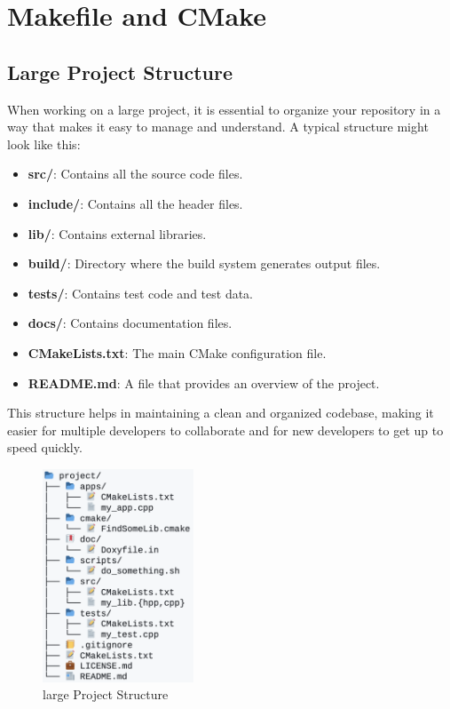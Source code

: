 
\chapter{Makefile and CMake}

\section{Large Project Structure}

When working on a large project, it is essential to organize your repository in a way that makes it easy to manage and understand. A typical structure might look like this:

\begin{itemize}
    \item \textbf{src/}: Contains all the source code files.
    \item \textbf{include/}: Contains all the header files.
    \item \textbf{lib/}: Contains external libraries.
    \item \textbf{build/}: Directory where the build system generates output files.
    \item \textbf{tests/}: Contains test code and test data.
    \item \textbf{docs/}: Contains documentation files.
    \item \textbf{CMakeLists.txt}: The main CMake configuration file.
    \item \textbf{README.md}: A file that provides an overview of the project.
\end{itemize}

This structure helps in maintaining a clean and organized codebase, making it easier for multiple developers to collaborate and for new developers to get up to speed quickly.

\begin{figure}[H]
    \centering 
    \includegraphics[width=0.4\textwidth]{assets/large_project.png}
    \caption{large Project Structure}
\end{figure}

